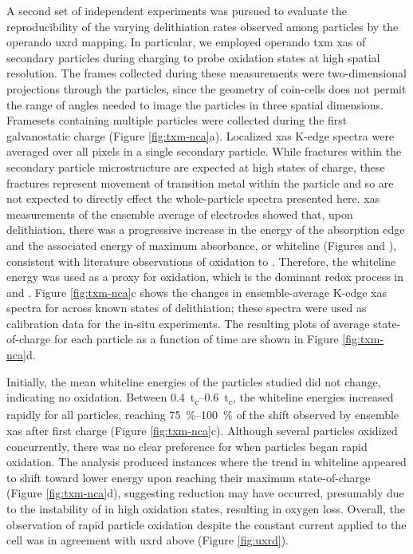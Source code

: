 \documentclass{article}
\begin{document}
A second set of independent experiments was pursued to evaluate the
reproducibility of the varying delithiation rates observed among
particles by the operando \gls{uxrd} mapping. In particular, we
employed operando \Gls{txm} \gls{xas} of \nca{} secondary particles
during charging to probe  oxidation states at high spatial
resolution. The frames collected during these measurements were
two-dimensional projections through the particles, since the geometry
of coin-cells does not permit the range of angles needed to image the
particles in three spatial dimensions. Framesets containing multiple
particles were collected during the first galvanostatic charge (Figure
\ref{fig:txm-nca}a). Localized \gls{xas} K-edge spectra were averaged
over all pixels in a single secondary particle. While fractures within
the secondary particle microstructure are expected at high states of
charge\cite{tsai2018}, these fractures represent movement of
transition metal within the particle and so are not expected to
directly effect the whole-particle spectra presented here. \gls{xas}
measurements of the ensemble average of electrodes showed that, upon
delithiation, there was a progressive increase in the energy of the
absorption edge and the associated energy of maximum absorbance, or
whiteline (Figures  and
), consistent with literature
observations of  oxidation to
\cite{deb2005,muto2009}. Therefore, the whiteline energy
was used as a proxy for  oxidation, which is the dominant redox
process in \nca{} and \nmc{}. Figure \ref{fig:txm-nca}c shows the
changes in ensemble-average  K-edge \gls{xas} spectra for
\nca{} across known states of delithiation; these spectra were used as
calibration data for the in-situ experiments. The resulting plots of
average state-of-charge for each particle as a function of time are
shown in Figure \ref{fig:txm-nca}d.

Initially, the mean whiteline energies of the particles studied did
not change, indicating no  oxidation. Between
\SIrange{0.4}{0.6}{t_c}, the whiteline energies increased rapidly for
all particles, reaching \SIrange{75}{100}{\percent} of the shift
observed by ensemble \gls{xas} after first charge (Figure
\ref{fig:txm-nca}c). Although several particles oxidized concurrently,
there was no clear preference for when particles began rapid
oxidation. The analysis produced instances where the trend in
whiteline appeared to shift toward lower energy upon reaching their
maximum state-of-charge (Figure \ref{fig:txm-nca}d), suggesting
 reduction may have occurred, presumably due to the instability
of  in high oxidation states\cite{myung2020-2}, resulting in
oxygen loss. Overall, the observation of rapid particle oxidation
despite the constant current applied to the cell was in agreement with
\gls{uxrd} above (Figure \ref{fig:uxrd}).
\end{document}
